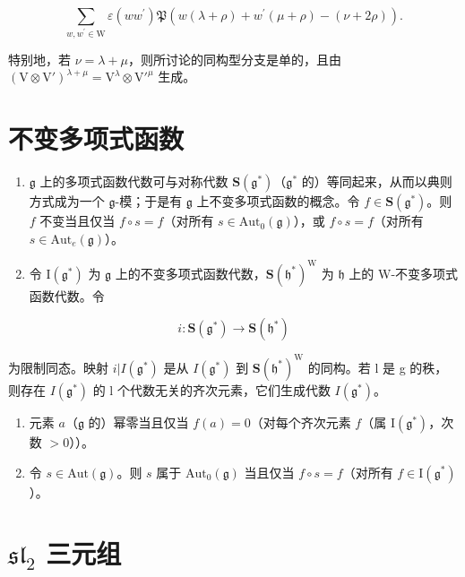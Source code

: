 \[
\sum_ {w, w ^ {\prime} \in \mathrm{W}} \varepsilon (w w ^ {\prime}) \mathfrak {P} (w (\lambda + \rho) + w ^ {\prime} (\mu + \rho) - (\nu + 2 \rho)).
\]

特别地，若 \(\nu = \lambda + \mu\)，则所讨论的同构型分支是单的，且由 \((\mathrm{V} \otimes \mathrm{V}')^{\lambda + \mu} = \mathrm{V}^{\lambda} \otimes \mathrm{V}'^{\mu}\) 生成。

\section*{不变多项式函数}

\begin{enumerate}
\def\labelenumi{\arabic{enumi})}
\setcounter{enumi}{28}
\item
  \(\mathfrak{g}\) 上的多项式函数代数可与对称代数 \(\mathbf{S}(\mathfrak{g}^*)\)（\(\mathfrak{g}^*\) 的）等同起来，从而以典则方式成为一个 \(\mathfrak{g}\)-模；于是有 \(\mathfrak{g}\) 上不变多项式函数的概念。令 \(f \in \mathbf{S}(\mathfrak{g}^*)\)。则 \(f\) 不变当且仅当 \(f \circ s = f\)（对所有 \(s \in \mathrm{Aut}_0(\mathfrak{g})\)），或 \(f \circ s = f\)（对所有 \(s \in \mathrm{Aut}_e(\mathfrak{g})\)）。
\item
  令 \(\mathrm{I}(\mathfrak{g}^*)\) 为 \(\mathfrak{g}\) 上的不变多项式函数代数，\(\mathbf{S}(\mathfrak{h}^*)^{\mathrm{W}}\) 为 \(\mathfrak{h}\) 上的 W-不变多项式函数代数。令
\end{enumerate}

\[
i: \mathbf {S} (\mathfrak {g} ^ {*}) \to \mathbf {S} (\mathfrak {h} ^ {*})
\]

为限制同态。映射 \(i|I(\mathfrak{g}^{*})\) 是从 \(I(\mathfrak{g}^{*})\) 到 \(\mathbf{S}(\mathfrak{h}^{*})^{\mathrm{W}}\) 的同构。若 l 是 g 的秩，则存在 \(I(\mathfrak{g}^{*})\) 的 l 个代数无关的齐次元素，它们生成代数 \(I(\mathfrak{g}^{*})\)。

\begin{enumerate}
\def\labelenumi{\arabic{enumi})}
\setcounter{enumi}{30}
\item
  元素 \(a\)（\(\mathfrak{g}\) 的）幂零当且仅当 \(f(a) = 0\)（对每个齐次元素 \(f\)（属 \(\mathrm{I}(\mathfrak{g}^*)\)，次数 \(> 0\)））。
\item
  令 \(s \in \mathrm{Aut}(\mathfrak{g})\)。则 \(s\) 属于 \(\mathrm{Aut}_0(\mathfrak{g})\) 当且仅当 \(f \circ s = f\)（对所有 \(f \in \mathrm{I}(\mathfrak{g}^*)\)）。
\end{enumerate}

\section*{\texorpdfstring{\(\mathfrak{sl}_2\) 三元组}{\textbackslash mathfrak\{sl\}\_2 三元组}}


